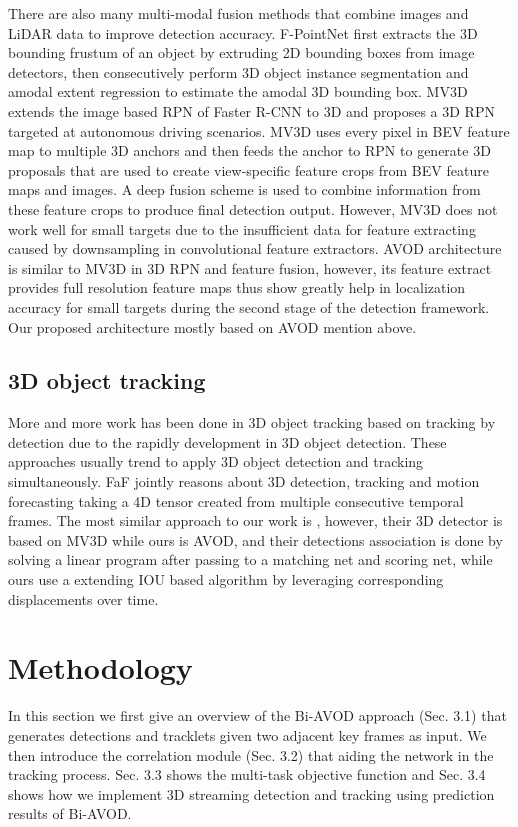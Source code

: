 \documentclass{bmvc2k}
\begin{document}
There are also many multi-modal fusion methods that combine images and LiDAR data to improve detection accuracy. F-PointNet \cite{qi2018frustum} first extracts the 3D bounding frustum of an object by extruding 2D bounding boxes from image detectors, then consecutively perform 3D object instance segmentation and amodal extent regression to estimate the amodal 3D bounding box. MV3D\cite{chen2017multi} extends the image based RPN of Faster R-CNN\cite{ren2015faster} to 3D and proposes a 3D RPN targeted at autonomous driving scenarios. MV3D uses every pixel in BEV feature map to multiple 3D anchors and then feeds the anchor to RPN to generate 3D proposals that are used to create view-specific feature crops from BEV feature maps and images. A deep fusion scheme is used to combine information from these feature crops to produce final detection output. However, MV3D does not work well for small targets due to the insufficient data for feature extracting caused by downsampling in convolutional feature extractors. AVOD\cite{ku2018joint} architecture is similar to MV3D in 3D RPN and feature fusion, however, its feature extract provides full resolution feature maps thus show greatly help in localization accuracy for small targets during the second stage of the detection framework. Our proposed architecture mostly based on AVOD mention above.

\subsection{3D object tracking}
More and more work has been done in 3D object tracking based on tracking by detection due to the rapidly development in 3D object detection. These approaches usually trend to apply 3D object detection and tracking simultaneously. FaF \cite{luo2018fast} jointly reasons about 3D detection, tracking and motion forecasting taking a 4D tensor created from multiple consecutive temporal frames. The most similar approach to our work is \cite{frossard2018end}, however, their 3D detector is based on MV3D while ours is AVOD, and their detections association is done by solving a linear program after passing to a matching net and scoring net, while ours use a extending IOU based algorithm \cite{bochinski2018extending} by leveraging corresponding displacements over time.
\section{Methodology}
\label{sec:method}
In this section we first give an overview of the Bi-AVOD approach (Sec. 3.1) that generates detections and tracklets given two adjacent key frames as input. We then introduce the correlation module (Sec. 3.2) that aiding the network in the tracking process. Sec. 3.3 shows the multi-task objective function and Sec. 3.4 shows how we implement 3D streaming detection and tracking using prediction results of Bi-AVOD.
\end{document}
